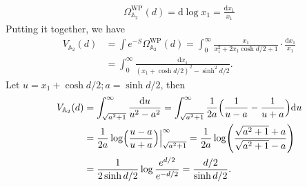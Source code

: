 \documentclass{amsart}
\renewcommand{\AA}{\mathbb{A}}
\theoremstyle{definition}
\begin{document}
\begin{align*}
\Omega^{\mathrm{WP}}_{\AA_2}(d) = \mathrm{d} \log x_1 =\frac{\mathrm{d}x_1}{x_1}
\end{align*}
Putting it together, we have
\begin{equation}
\begin{split}
V_{\mathbb{A}_{2}}(d) &= \int e^{-S} \Omega^{\mathrm{WP}}_{\AA_2}(d) =  \int_0^\infty \frac{x_1}{x_1^2+2x_1 \cosh d/2+1} \cdot \frac{\mathrm{d}x_1}{x_1} \\& 
= \int_0^\infty \frac{\mathrm{d}x_1}{(x_1+\cosh d/2)^2-\sinh^2d/2}.
\end{split}
\end{equation}
Let $u = x_1+\cosh d/2; a= \sinh d/2$, then 
\begin{equation}
\begin{split}
V_{\mathbb{A}_{2}}(d) &=     \int_{\sqrt{a^2+1}}^\infty \frac{\mathrm{d}u}{u^2-a^2} = \int_{\sqrt{a^2+1}}^\infty\frac{1}{2a}\Bigl( \frac{1}{u-a}-\frac{1}{u+a} \Bigr) \mathrm{d}u \\& = \frac{1}{2a}\log\Bigl(\frac{u-a}{u+a}\Bigr)\Big|_{\sqrt{a^2+1}}^\infty
 = \frac{1}{2a}\log\Biggl(\frac{\sqrt{a^2+1}+a}{\sqrt{a^2+1}-a}\Biggr) \\& = \frac{1}{2\sinh d/2}\log \frac{e^{d/2}}{e^{-d/2}} =\frac{d/2}{\sinh d/2}.
\end{split}    
\end{equation}
\medskip
\end{document}
